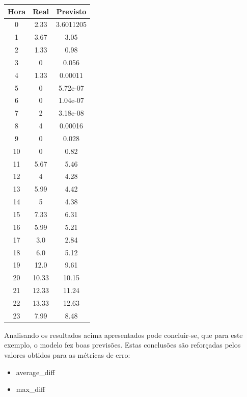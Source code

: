 \documentclass[a4paper, 12pt]{article}
\begin{document}
\begin{table}[H]
	\centering
	\begin{tabular}{||c||c|c||}
		\hline\hline
		Hora & Real&Previsto\\
		\hline\hline
		0 & 
		2.33
		&3.6011205 \\
		\hline
		1  &
		3.67 &3.05 \\
		\hline
		2 &  1.33& 0.98	\\
		\hline
		3  & 
		0
		&0.056 \\
		\hline
		4 & 1.33
		&0.00011 \\
		\hline
		5  & 
		0 &5.72e-07 \\
		\hline
		6 & 
		0
		& 
		
		1.04e-07 \\
		\hline
		7 & 
		2
		& 3.18e-08\\
		\hline
		8  &
		4 & 0.00016\\
		\hline
		9 &  0& 0.028	\\
		\hline
		10 & 
		0
		& 0.82\\
		\hline
		11  &
		5.67 & 5.46\\
		\hline
		12 & 4 & 4.28	\\
		\hline
		13  & 5.99
		
		&4.42 \\
		\hline
		14 & 
		5 &4.38 \\
		\hline
		15  & 7.33
		& 6.31 \\
		\hline
		16 & 
		5.99
		& 
		5.21
		\\
		\hline
		17 & 
		3.0
		& 2.84\\
		\hline
		18  &
		6.0 & 5.12\\
		\hline
		19 & 12.0 & 9.61	\\
		\hline
		20 & 
		10.33
		&10.15 \\
		\hline
		21  &
		12.33 &11.24 \\
		\hline
		22 & 13.33 & 12.63	\\
		\hline
		23  & 
		7.99
		& 8.48\\
		\hline\hline
	\end{tabular}
\end{table}

Analisando os resultados acima apresentados pode concluir-se, que para este exemplo, o modelo fez boas previsões. Estas conclusões são reforçadas pelos valores obtidos para as métricas de erro:

\begin{itemize}
	\item average\_diff
	\item max\_diff
\end{itemize}
\end{document}
